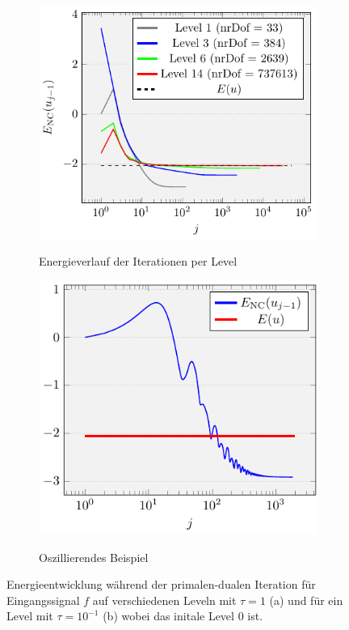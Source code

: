\begin{figure}[p]
  \centering
  \begin{subfigure}[b]{.5\linewidth}
    \centering
    \caption{Energieverlauf der Iterationen per Level}
    \includegraphics[width=\linewidth]
      {pictures/chapExperiments/secExactSol/iteration/lvlWise/convEnergy.pdf}
    \label{fig:iterationEnergyLevel}
  \end{subfigure}
  \quad
  \begin{subfigure}[b]{.46\linewidth}
    \centering
    \caption{Oszillierendes Beispiel}
    \includegraphics[width=\linewidth]
      {pictures/chapExperiments/secExactSol/iteration/osc/convEnergy.pdf}
    \label{fig:iterationEnergyOscillations}
  \end{subfigure}
  \caption{Energieentwicklung während der primalen-dualen Iteration für
  Eingangssignal $f$ auf verschiedenen Leveln mit $\tau=1$ (a) und für ein
  Level mit $\tau=10^{-1}$ (b) wobei das initale Level 0 ist.}
  \label{fig:iterationEnergy}
\end{figure}
